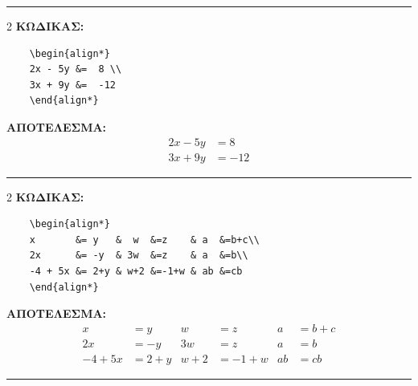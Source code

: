 \documentclass[a4paper, 12pt, oneside, xelatex, final]{article}
\begin{document}
	\vspace*{-3ex}\hrule\vspace*{-1ex}
	\begin{multicols}{2}
	\noindent \label{example4}
	\textbf{ΚΩΔΙΚΑΣ:}
	\begin{verbatim}
	\begin{align*} 
	2x - 5y &=  8 \\ 
	3x + 9y &=  -12
	\end{align*}
	\end{verbatim}
	\columnbreak
	\phantom{.}\hspace{5em}\textbf{ΑΠΟΤΕΛΕΣΜΑ:}\\[-0.8cm]
	\begin{align*} 
	2x - 5y &=  8 \\ 
	3x + 9y &=  -12
	\end{align*}
	\end{multicols}
	\vspace*{-3ex}\hrule\vspace*{-1ex}
	\begin{multicols}{2}
	\noindent \label{example5}
	\textbf{ΚΩΔΙΚΑΣ:}
	\begin{verbatim}
	\begin{align*}
	x       &= y   &  w  &=z    & a  &=b+c\\
	2x      &= -y  & 3w  &=z    & a  &=b\\
	-4 + 5x &= 2+y & w+2 &=-1+w & ab &=cb
	\end{align*}
	\end{verbatim}
	\columnbreak
	\phantom{.}\hspace{5em}\textbf{ΑΠΟΤΕΛΕΣΜΑ:}\\[-0.8cm]
	\begin{align*}
	x       &=y   &  w  &=z    & a  &=b+c\\
	2x      &=-y  & 3w  &=z    & a  &=b\\
	-4 + 5x &=2+y & w+2 &=-1+w & ab &=cb
	\end{align*}
	\end{multicols}
	\vspace*{-3ex}\hrule\vspace*{-1ex}
\end{document}

